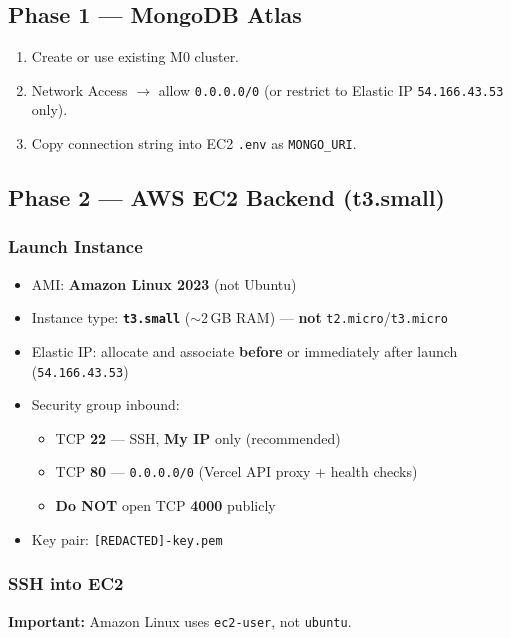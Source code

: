 \documentclass[11pt,a4paper]{article}
\newcommand{\maskedpem}{\texttt{[REDACTED]-key.pem}}
\newcommand{\productionip}{\texttt{54.166.43.53}}
\begin{document}
\subsection{Phase 1 --- MongoDB Atlas}
\begin{enumerate}[noitemsep]
  \item Create or use existing M0 cluster.
  \item Network Access $\rightarrow$ allow \texttt{0.0.0.0/0} (or restrict to Elastic IP \productionip{} only).
  \item Copy connection string into EC2 \texttt{.env} as \texttt{MONGO\_URI}.
\end{enumerate}

\subsection{Phase 2 --- AWS EC2 Backend (t3.small)}

\subsubsection{Launch Instance}
\begin{itemize}[noitemsep]
  \item AMI: \textbf{Amazon Linux 2023} (not Ubuntu)
  \item Instance type: \textbf{\texttt{t3.small}} ($\sim$2\,GB RAM) --- \textbf{not} \texttt{t2.micro}/\texttt{t3.micro}
  \item Elastic IP: allocate and associate \textbf{before} or immediately after launch (\productionip)
  \item Security group inbound:
  \begin{itemize}[noitemsep]
    \item TCP \textbf{22} --- SSH, \textbf{My IP} only (recommended)
    \item TCP \textbf{80} --- \texttt{0.0.0.0/0} (Vercel API proxy + health checks)
    \item \textbf{Do NOT} open TCP \textbf{4000} publicly
  \end{itemize}
  \item Key pair: \maskedpem
\end{itemize}

\subsubsection{SSH into EC2}
\textbf{Important:} Amazon Linux uses \texttt{ec2-user}, not \texttt{ubuntu}.
\end{document}

